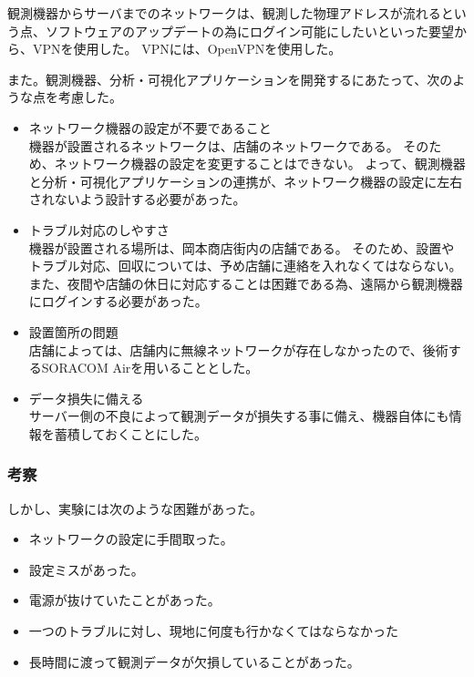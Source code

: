 観測機器からサーバまでのネットワークは、観測した物理アドレスが流れるという点、ソフトウェアのアップデートの為にログイン可能にしたいといった要望から、VPNを使用した。
VPNには、OpenVPNを使用した。

また。観測機器、分析・可視化アプリケーションを開発するにあたって、次のような点を考慮した。
\begin{itemize}
\item ネットワーク機器の設定が不要であること\\
	機器が設置されるネットワークは、店舗のネットワークである。
	そのため、ネットワーク機器の設定を変更することはできない。
	よって、観測機器と分析・可視化アプリケーションの連携が、ネットワーク機器の設定に左右されないよう設計する必要があった。
\item トラブル対応のしやすさ\\
	機器が設置される場所は、岡本商店街内の店舗である。
	そのため、設置やトラブル対応、回収については、予め店舗に連絡を入れなくてはならない。
	また、夜間や店舗の休日に対応することは困難である為、遠隔から観測機器にログインする必要があった。
\item 設置箇所の問題\\
	店舗によっては、店舗内に無線ネットワークが存在しなかったので、後術するSORACOM Airを用いることとした。
\item データ損失に備える\\
	サーバー側の不良によって観測データが損失する事に備え、機器自体にも情報を蓄積しておくことにした。
\end{itemize}

\subsubsection{考察}

しかし、実験には次のような困難があった。
\begin{itemize}
\item ネットワークの設定に手間取った。
\item 設定ミスがあった。
\item 電源が抜けていたことがあった。
\item 一つのトラブルに対し、現地に何度も行かなくてはならなかった
\item 長時間に渡って観測データが欠損していることがあった。
\end{itemize}

